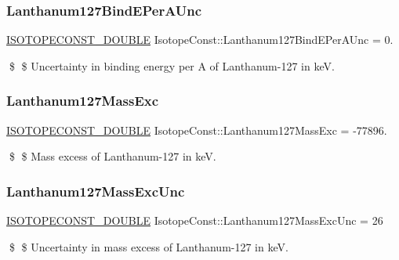 \subsubsection{\texorpdfstring{Lanthanum127\+Bind\+E\+Per\+A\+Unc}{Lanthanum127BindEPerAUnc}}
{\footnotesize\ttfamily \mbox{\hyperlink{group___isotope_const-_macros_ga8f45a7272ce02c0b4c65c44636ed719a}{I\+S\+O\+T\+O\+P\+E\+C\+O\+N\+S\+T\+\_\+\+D\+O\+U\+B\+LE}} Isotope\+Const\+::\+Lanthanum127\+Bind\+E\+Per\+A\+Unc = 0.}

\$ \$ Uncertainty in binding energy per A of Lanthanum-\/127 in keV. \mbox{\label{group___isotope_const-_lanthanum-_la127_gadb763e45b472274ce8b5872be1826cbd}} 
\subsubsection{\texorpdfstring{Lanthanum127\+Mass\+Exc}{Lanthanum127MassExc}}
{\footnotesize\ttfamily \mbox{\hyperlink{group___isotope_const-_macros_ga8f45a7272ce02c0b4c65c44636ed719a}{I\+S\+O\+T\+O\+P\+E\+C\+O\+N\+S\+T\+\_\+\+D\+O\+U\+B\+LE}} Isotope\+Const\+::\+Lanthanum127\+Mass\+Exc = -\/77896.}

\$ \$ Mass excess of Lanthanum-\/127 in keV. \mbox{\label{group___isotope_const-_lanthanum-_la127_ga1da889e5b5727460608e12e83fa8519b}} 
\subsubsection{\texorpdfstring{Lanthanum127\+Mass\+Exc\+Unc}{Lanthanum127MassExcUnc}}
{\footnotesize\ttfamily \mbox{\hyperlink{group___isotope_const-_macros_ga8f45a7272ce02c0b4c65c44636ed719a}{I\+S\+O\+T\+O\+P\+E\+C\+O\+N\+S\+T\+\_\+\+D\+O\+U\+B\+LE}} Isotope\+Const\+::\+Lanthanum127\+Mass\+Exc\+Unc = 26}

\$ \$ Uncertainty in mass excess of Lanthanum-\/127 in keV. \mbox{\label{group___isotope_const-_lanthanum-_la127_ga44a5503269f64af07f2a4e01e34c88c8}} 
